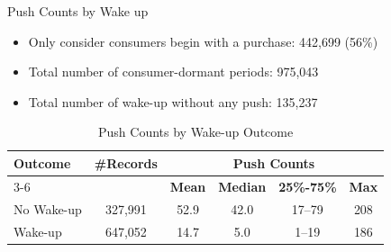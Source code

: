 \documentclass[aspectratio=169]{beamer}  %
\begin{document}
\begin{frame}{Push Counts by Wake up}
\begin{itemize}
    \item Only consider consumers begin with a purchase: 442,699 (56\%)
    \item Total number of consumer-dormant periods: 975,043
    \item Total number of wake-up without any push: 135,237
\end{itemize}
\begin{table}[h]
\centering
\caption{Push Counts by Wake-up Outcome}
\label{tab:push_count_compact}
\footnotesize
\begin{tabular}{lccccc}
\toprule
\textbf{Outcome} & \textbf{\#Records} & \multicolumn{4}{c}{\textbf{Push Counts}} \\
\cmidrule(lr){3-6}
& & \textbf{Mean} & \textbf{Median} & \textbf{25\%-75\%} & \textbf{Max} \\
\midrule
No Wake-up & 327,991 & 52.9 & 42.0 & 17--79 & 208 \\
Wake-up & 647,052 & 14.7 & 5.0 & 1--19 & 186 \\
\bottomrule
\end{tabular}
\end{table}
\end{frame}
\end{document}
